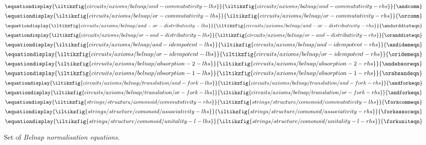 \documentclass[10pt]{article}
\begin{document}
\begin{figure}[p]
{    }{
    }{\orassoc}\)
    \quad
    \(\equationdisplay{
        \iltikzfig{circuits/axioms/belnap/and-commutativity-lhs}
    }{
        \iltikzfig{circuits/axioms/belnap/and-commutativity-rhs}
    }{\andcomm}\)
    \quad
    \(\equationdisplay{
        \iltikzfig{circuits/axioms/belnap/or-commutativity-lhs}
    }{
        \iltikzfig{circuits/axioms/belnap/or-commutativity-rhs}
    }{\orcomm}\)
    \\[1em]
    \(\equationdisplay{
        \iltikzfig{circuits/axioms/belnap/and-or-distributivity-lhs}
    }{
        \iltikzfig{circuits/axioms/belnap/and-or-distributivity-rhs}
    }{\andorddisteqn}\)
    \quad
    \(\equationdisplay{
        \iltikzfig{circuits/axioms/belnap/or-and-distributivity-lhs}
    }{
        \iltikzfig{circuits/axioms/belnap/or-and-distributivity-rhs}
    }{\oranddisteqn}\)
    \quad
    \(\equationdisplay{
        \iltikzfig{circuits/axioms/belnap/and-idempotent-lhs}
    }{
        \iltikzfig{circuits/axioms/belnap/and-idempotent-rhs}
    }{\andidemeqn}\)
    \quad
    \(\equationdisplay{
        \iltikzfig{circuits/axioms/belnap/or-idempotent-lhs}
    }{
        \iltikzfig{circuits/axioms/belnap/or-idempotent-rhs}
    }{\oridemeqn}\)
    \\[1em]
    \(\equationdisplay{
        \iltikzfig{circuits/axioms/belnap/absorption-2-lhs}
    }{
        \iltikzfig{circuits/axioms/belnap/absorption-2-rhs}
    }{\andabsoreqn}\)
    \quad
    \(\equationdisplay{
        \iltikzfig{circuits/axioms/belnap/absorption-1-lhs}
    }{
        \iltikzfig{circuits/axioms/belnap/absorption-1-rhs}
    }{\orabsandeqn}\)
    \(\equationdisplay{
        \iltikzfig{circuits/axioms/belnap/translation/and-fork-lhs}
    }{
        \iltikzfig{circuits/axioms/belnap/translation/and-fork-rhs}
    }{\andforkeqn}\)
    \quad
    \(\equationdisplay{
        \iltikzfig{circuits/axioms/belnap/translation/or-fork-lhs}
    }{
        \iltikzfig{circuits/axioms/belnap/translation/or-fork-rhs}
    }{\andforkeqn}\)
    \\[1em]
    \(\equationdisplay{
        \iltikzfig{strings/structure/comonoid/commutativity-rhs}
    }{
        \iltikzfig{strings/structure/comonoid/commutativity-lhs}
    }{\forkcommeqn}\)
    \quad
    \(\equationdisplay{
        \iltikzfig{strings/structure/comonoid/associativity-lhs}
    }{
        \iltikzfig{strings/structure/comonoid/associativity-rhs}
    }{\forkassoceqn}\)
    \quad
    \(\equationdisplay{
        \iltikzfig{strings/structure/comonoid/unitality-l-lhs}
    }{
        \iltikzfig{strings/structure/comonoid/unitality-l-rhs}
    }{\forkuniteqn}\)
    \caption{
        Set of \emph{Belnap normalisation equations}.
    }
    \label{fig:normal-form-equations}
\end{figure}


\printbibliography[heading=bibintoc,title={References}]
\end{document}
